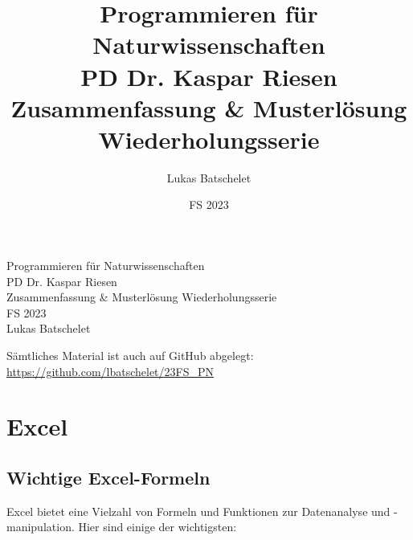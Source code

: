 \documentclass[11pt, oneside]{book}
\title{\sffamily Programmieren für Naturwissenschaften\\ \large PD Dr. Kaspar Riesen\\ \LARGE Zusammenfassung \& Musterlösung Wiederholungsserie}
\author{\sffamily Lukas Batschelet}
\date{\sffamily FS 2023}
\newcommand{\github}[1]{%
   \href{#1}{\faGithubSquare}%
}
\begin{document}
\begin{titlepage}
    \begin{center}
        {\LARGE Programmieren für Naturwissenschaften}\\[0.5cm]
        {\large PD Dr. Kaspar Riesen}\\[0.3cm]
        {\LARGE Zusammenfassung \& Musterlösung Wiederholungsserie}\\[0.5cm]
        {\large FS 2023}\\[2cm]
        {\large Lukas Batschelet}\\[0.3cm]
    \end{center}
    \vfill %
    \noindent \github{https://github.com/lbatschelet/Programmieren-fuer-Naturwissenschaften} Sämtliches Material ist auch auf GitHub abgelegt: \href{https://github.com/lbatschelet/23FS_PN}{https://github.com/lbatschelet/23FS\_PN}
    \doclicenseThis
\end{titlepage}

\tableofcontents

\chapter{Excel}

\section{Wichtige Excel-Formeln}

Excel bietet eine Vielzahl von Formeln und Funktionen zur Datenanalyse und -manipulation. Hier sind einige der wichtigsten:
\end{document}
